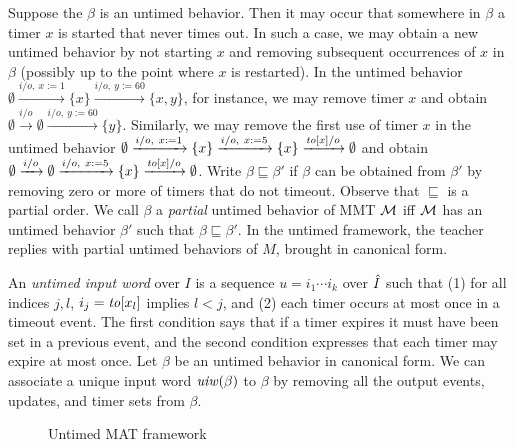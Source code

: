 Suppose the $\beta$ is an untimed behavior. Then it may occur that somewhere in $\beta$ a timer $x$ is started that never times out.
In such a case, we may obtain a new untimed behavior by not starting $x$ and removing subsequent occurrences of $x$ in $\beta$ (possibly up to the point
where $x$ is restarted).
In the untimed behavior $\emptyset \xrightarrow{i/o,~ x:=1 } \{ x\} \xrightarrow{i/o,~ y:=60 } \{ x, y\}$, for instance, we may remove timer $x$
and obtain $\emptyset \xrightarrow{i/o } \emptyset \xrightarrow{i/o,~ y:=60 } \{ y\}$.
Similarly, we may remove the first use of timer $x$ in the untimed behavior 
$\emptyset \xrightarrow{i/o,~ x:=1 } \{ x\} \xrightarrow{i/o,~ x:=5 } \{ x\} \xrightarrow{\mathit{to}[x]/o} \emptyset$ and obtain
$\emptyset \xrightarrow{i/o } \emptyset \xrightarrow{i/o,~ x:=5 } \{ x\} \xrightarrow{\mathit{to}[x]/o} \emptyset$.
Write $\beta \sqsubseteq \beta'$ if $\beta$ can be obtained from $\beta'$ by removing zero or more of timers that do not timeout.
Observe that $\sqsubseteq$ is a partial order.
We call $\beta$ a \emph{partial} untimed behavior of MMT ${\mathcal M}$ iff ${\mathcal M}$ has an untimed behavior $\beta'$ such that $\beta \sqsubseteq \beta'$.
In the untimed framework, the teacher replies with partial untimed behaviors of $M$, brought in canonical form.

An \emph{untimed input word} over $I$ is a sequence $u = i_1 \cdots i_k$ over $\hat{I}$ such that (1)
for all indices $j, l$, $i_j = \mathit{to}[x_l]$ implies $l < j$, and (2) each timer occurs at most once in a timeout event.
The first condition  says that if a timer expires it must have been set in a previous event, and the second condition  expresses that
each timer may expire at most once.
Let $\beta$ be an untimed behavior in canonical form.
We can associate a unique input word $\mathit{uiw}(\beta)$ to $\beta$ by removing all the output events,
updates, and timer sets from $\beta$.
\iflong
\begin{figure}
\begin{center}
\end{center}    
\caption{Untimed MAT framework}
\label{fig:untimed MAT}
\end{figure}
\fi

